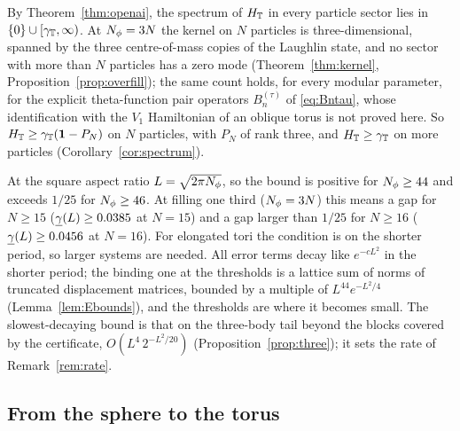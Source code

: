 By Theorem~\ref{thm:openai}, the spectrum of $H_{\mathbb{T}}$ in every particle sector lies in $\{0\}\cup[\gamma_{\mathbb{T}},\infty)$. At $N_{\phi}=3N$ the kernel on
$N$ particles is three-dimensional, spanned by the three centre-of-mass copies of the Laughlin state, and no sector with more than
$N$ particles has a zero mode (Theorem~\ref{thm:kernel}, Proposition~\ref{prop:overfill}); the same count holds, for every modular
parameter, for the explicit theta-function pair operators $B_n^{(\tau)}$ of \eqref{eq:Bntau}, whose identification with the $V_1$
Hamiltonian of an oblique torus is not proved here. So $H_{\mathbb{T}}\ge\gamma_{\mathbb{T}}(\mathbf{1}-P_N)$ on $N$ particles, with $P_N$ of rank three, and
$H_{\mathbb{T}}\ge\gamma_{\mathbb{T}}$ on more particles (Corollary~\ref{cor:spectrum}).

At the square aspect ratio $L=\sqrt{2\pi N_{\phi}}$, so the bound is positive for $N_{\phi}\ge44$ and exceeds $1/25$ for $N_{\phi}\ge46$. At
filling one third ($N_{\phi}=3N$) this means a gap for $N\ge15$ ($\underline{\gamma}(L)\ge0.0385$ at $N=15$) and a gap larger than $1/25$ for $N\ge16$
($\underline{\gamma}(L)\ge0.0456$ at $N=16$). For elongated tori the condition is on the shorter period, so larger systems are needed. All error terms
decay like $e^{-cL^2}$ in the shorter period; the binding one at the thresholds is a lattice sum of norms of truncated
displacement matrices, bounded by a multiple of $L^{44}e^{-L^2/4}$ (Lemma~\ref{lem:Ebounds}), and the thresholds are where it
becomes small. The slowest-decaying bound is that on the three-body tail beyond the blocks covered by the certificate,
$O(L^4\,2^{-L^2/20})$ (Proposition~\ref{prop:three}); it sets the rate of Remark~\ref{rem:rate}.

\subsection{From the sphere to the torus}


